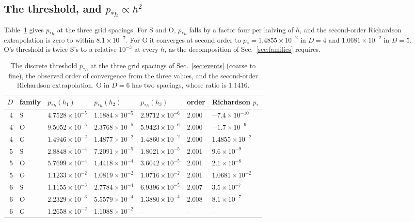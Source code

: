 \documentclass[11pt]{article}
\newcommand{\pst}{p_{*h}}
\begin{document}
\subsection{The threshold, and \texorpdfstring{$\pst\propto h^2$}{p*h ~ h2}}\label{sec:pstar}

Table~\ref{tab:pstar} gives $\pst$ at the three grid spacings. For S and O, $\pst$ falls by a factor four per halving of
$h$, and the second-order Richardson extrapolation is zero to within $8.1\times10^{-7}$. For G it converges at second
order to $p_*=1.4855\times10^{-2}$ in $D=4$ and $1.0681\times10^{-2}$ in $D=5$. O's threshold is twice S's to a relative
$10^{-3}$ at every $h$, as the decomposition of Sec.~\ref{sec:families} requires.

\begin{table}[tbp]
\centering
\caption{The discrete threshold $\pst$ at the three grid spacings of Sec.~\ref{sec:events} (coarse to fine), the observed
order of convergence from the three values, and the second-order Richardson extrapolation. G in $D=6$ has two spacings,
whose ratio is $1.1416$.}
\label{tab:pstar}
\small
\begin{tabular}{rllllll}
\toprule
$D$ & family & $\pst(h_1)$ & $\pst(h_2)$ & $\pst(h_3)$ & order & Richardson $p_*$ \\
\midrule
4 & S & $4.7528\times10^{-5}$ & $1.1884\times10^{-5}$ & $2.9712\times10^{-6}$ & 2.000 & $-7.4\times10^{-10}$ \\
4 & O & $9.5052\times10^{-5}$ & $2.3768\times10^{-5}$ & $5.9423\times10^{-6}$ & 2.000 & $-1.7\times10^{-9}$ \\
4 & G & $1.4946\times10^{-2}$ & $1.4877\times10^{-2}$ & $1.4860\times10^{-2}$ & 2.000 & $1.4855\times10^{-2}$ \\
5 & S & $2.8848\times10^{-4}$ & $7.2091\times10^{-5}$ & $1.8021\times10^{-5}$ & 2.001 & $9.6\times10^{-9}$ \\
5 & O & $5.7699\times10^{-4}$ & $1.4418\times10^{-4}$ & $3.6042\times10^{-5}$ & 2.001 & $2.1\times10^{-8}$ \\
5 & G & $1.1233\times10^{-2}$ & $1.0819\times10^{-2}$ & $1.0716\times10^{-2}$ & 2.001 & $1.0681\times10^{-2}$ \\
6 & S & $1.1155\times10^{-3}$ & $2.7784\times10^{-4}$ & $6.9396\times10^{-5}$ & 2.007 & $3.5\times10^{-7}$ \\
6 & O & $2.2329\times10^{-3}$ & $5.5579\times10^{-4}$ & $1.3880\times10^{-4}$ & 2.008 & $8.1\times10^{-7}$ \\
6 & G & $1.2658\times10^{-2}$ & $1.1088\times10^{-2}$ & -- & -- & -- \\
\bottomrule
\end{tabular}
\end{table}
\end{document}
